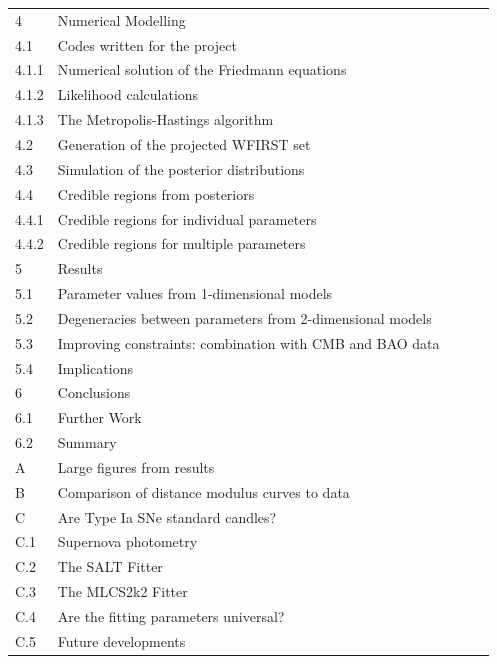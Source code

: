\documentclass{article}
\newcommand{\done}{\textcolor{green!60!black}{\ding{51}}}
\begin{document}
\begin{longtable}{|p{2.2cm}|p{6.5cm}|p{2.2cm}|p{2.2cm}|p{2.5cm}|}
4 & Numerical Modelling  & \done & \done & \\
4.1 & Codes written for the project  & \done & \done & \\
4.1.1 & Numerical solution of the Friedmann equations  & \done & \done & \\
4.1.2 & Likelihood calculations  & \done & \done & \\
4.1.3 & The Metropolis-Hastings algorithm  & \done & \done & \\
4.2 & Generation of the projected WFIRST set  & \done & \done & \\
4.3 & Simulation of the posterior distributions  & \done & \done & \\
4.4 & Credible regions from posteriors  & \done & \done & \\
4.4.1 & Credible regions for individual parameters  & \done & \done & \\
4.4.2 & Credible regions for multiple parameters  & \done & \done & \\

5 & Results  & \done & \done & \\
5.1 & Parameter values from 1-dimensional models  & \done & \done & \\
5.2 & Degeneracies between parameters from 2-dimensional models & \done & \done & \\
5.3 & Improving constraints: combination with CMB and BAO data & \done & \done & \\
5.4 & Implications & \done & \done & \\

6 & Conclusions & \done & \done & \\
6.1 & Further Work  & \done & \done & \\
6.2 & Summary  & \done & \done & \\

A & Large figures from results  & \done & \done & \\
B & Comparison of distance modulus curves to data  & \done & \done & \\
C & Are Type Ia SNe standard candles?  & \done & \done & \\
C.1 & Supernova photometry  & \done & \done & \\
C.2 & The SALT Fitter  & \done & \done & \\
C.3 & The MLCS2k2 Fitter & \done & \done & \\
C.4 & Are the fitting parameters universal?  & \done & \done & \\
C.5 & Future developments  & \done & \done & \\

\hline
\end{longtable}
\end{document}
